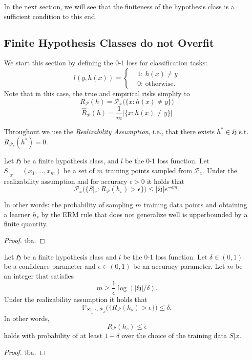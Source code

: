 In the next section, we will see that the finiteness of the hypothesis class is
a sufficient condition to this end. 

\subsection{Finite Hypothesis Classes do not Overfit}
We start this section by defining the 0-1 loss for classification tasks:
\begin{equation*}
    l(y, h(x)) =
    \begin{cases}
         & 1: \ h(x) \neq y \\
        & 0: \ \text{otherwise}.
    \end{cases}	
\end{equation*}
Note that in this case, the true and empirical risks simplify to
$$
R_{\mathcal{P}}(h) = \mathcal{P}_x \bigl(\{x: h(x) \neq y\} \bigr)
$$
$$
\hat{R}_{\mathcal{P}}(h) = \frac{1}{m} | \{x: h(x) \neq y\} |
$$

Throughout we use the 
 \emph{Realizability Assumption}, i.e., that
there exists $h^* \in \mathfrak{H}$ s.t. $R_{\mathcal{P}_z}(h^*) = 0$.

    \begin{lemma}
		Let $\mathfrak{H}$ be a finite hypothesis class, and $l$ be the 0-1 loss
		function. Let $S|_x = (x_1, \dots, x_m)$ be a set of $m$ training points
		sampled from $\mathcal{P}_x$. Under the realizability assumption and
		for accuracy $\epsilon >0$ it holds that 
		$$
		\mathcal{P}_x\bigl(\{S|_x: R_\mathcal{P}(h_s) > \epsilon\} \bigr) \leq |\mathfrak{H}| e ^{-\epsilon m}.
		$$
	\end{lemma}
	In other words: the probability of sampling $m$ training data points and
	obtaining a learner $h_s$ by the ERM rule that does not generalize well is
	upperbounded by a finite quantity.
\begin{proof}
    tba.
\end{proof}
    \begin{coro}
		\label{Coro:finite_hypo}
		Let $\mathfrak{H}$ be a finite hypothesis class and $l$ be the 0-1 loss
		function. Let $\delta \in (0,1)$ be a confidence parameter and $\epsilon \in
		(0,1)$ be an accuracy parameter. Let $m$ be an integer that satisfies
		$$
		m \geq \frac{1}{\epsilon} \log(|\mathfrak{H}|/\delta).
		$$ 	
		Under the realizability assumption it holds that 
		$$
		\mathbb{P}_{S|_x \sim \mathcal{P}_x} \bigl( \{ R_\mathcal{P}(h_s) > \epsilon \}\bigr) \leq \delta.
		$$
		In other words, 
		$$
		R_\mathcal{P}(h_s) \leq \epsilon
		$$
		holds with probability of at least $1-\delta$ over the choice of the
		training data $S|x$.
	\end{coro}
    \begin{proof}
        tba.
    \end{proof}
